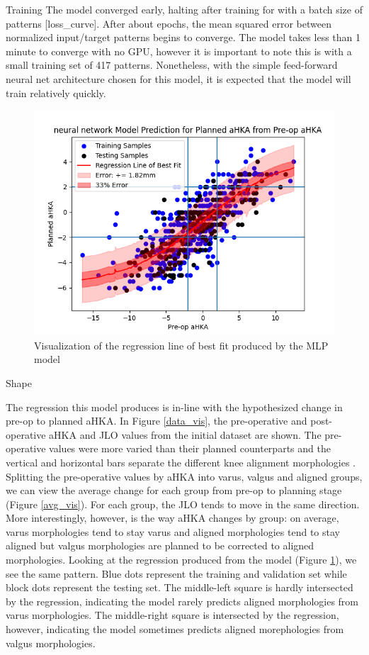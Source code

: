 \documentclass{article}
\begin{document}
Training
	The model converged early, halting after training for \epochs with a batch size of \batchsize patterns [loss\_curve].
After about \convergence epochs, the mean squared error between normalized input/target patterns begins to converge.
The model takes less than 1 minute to converge with no GPU, however it is important to note this is with a small training set of 417 patterns.
Nonetheless, with the simple feed-forward neural net architecture chosen for this model, it is expected that the model will train relatively quickly. 

\begin{figure}[t]
	\centering
	\includegraphics[width=.5\linewidth]{neural_network_regression.png}
	\caption{Visualization of the regression line of best fit produced by the MLP model}
	\label{regression}
\end{figure}

Shape

	The regression this model produces is in-line with the hypothesized change in pre-op to planned aHKA.
In Figure \ref{data_vis}, the pre-operative and post-operative aHKA and JLO values from the initial dataset are shown.
The pre-operative values were more varied than their planned counterparts and the vertical and horizontal bars separate the different knee alignment morphologies \cite{cpak-paper}.
Splitting the pre-operative values by aHKA into varus, valgus and aligned groups, we can view the average change for each group from pre-op to planning stage (Figure \ref{avg_vis}).
For each group, the JLO tends to move in the same direction. More interestingly, however, is the way aHKA changes by group: 
on average, varus morphologies tend to stay varus and aligned morphologies tend to stay aligned but valgus morphologies are planned to be corrected to aligned morphologies.
Looking at the regression produced from the model (Figure \ref{regression}), we see the same pattern.
Blue dots represent the training and validation set while block dots represent the testing set.
The middle-left square is hardly intersected by the regression, indicating the model rarely predicts aligned morphologies from varus morphologies.
The middle-right square is intersected by the regression, however, indicating the model sometimes predicts aligned morephologies from valgus morphologies.
\end{document}
